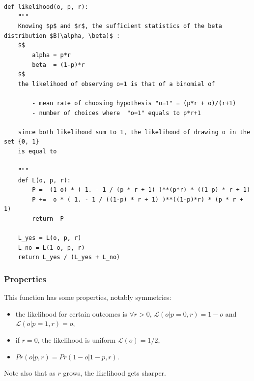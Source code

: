 \documentclass[12pt,english]{article}%
\newcommand{\Ll}{\mathcal{L}}
\newcommand{\seeApp}[1]{Appendix~\ref{app:#1}}
\begin{document}
\begin{lstlisting}
def likelihood(o, p, r):
    """
    Knowing $p$ and $r$, the sufficient statistics of the beta distribution $B(\alpha, \beta)$ :
    $$
        alpha = p*r
        beta  = (1-p)*r
    $$
    the likelihood of observing o=1 is that of a binomial of

        - mean rate of choosing hypothesis "o=1" = (p*r + o)/(r+1)
        - number of choices where  "o=1" equals to p*r+1

    since both likelihood sum to 1, the likelihood of drawing o in the set {0, 1}
    is equal to

    """
    def L(o, p, r):
        P =  (1-o) * ( 1. - 1 / (p * r + 1) )**(p*r) * ((1-p) * r + 1)
        P +=  o * ( 1. - 1 / ((1-p) * r + 1) )**((1-p)*r) * (p * r + 1)
        return  P

    L_yes = L(o, p, r)
    L_no = L(1-o, p, r)
    return L_yes / (L_yes + L_no)

\end{lstlisting}

\subsubsection{Properties}
This function has some properties, notably symmetries:
	\begin{itemize}
		\item the likelihood for certain outcomes is $\forall r >0$, $\Ll(o|p=0, r)=1-o$ and $\Ll(o|p=1, r)=o$,
		\item if $r=0$, the likelihood is uniform $\Ll(o)=1/2$,
		\item $Pr(o | p, r)=Pr(1-o | 1-p, r)$.
	\end{itemize}

Note also that as $r$ grows, the likelihood gets sharper.



{\tiny
\printbibliography
}
\end{document}
